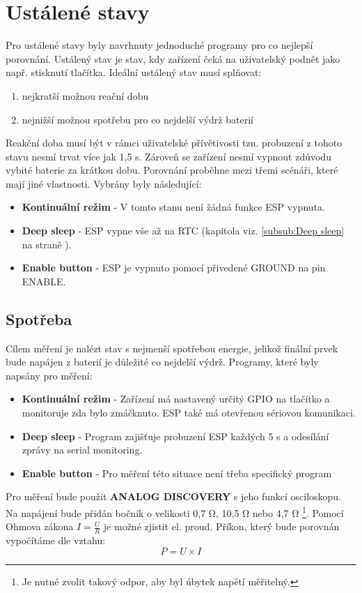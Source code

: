 \documentclass[a4paper, 12pt]{report}
\begin{document}
			\section{Ustálené stavy}
				Pro ustálené stavy byly navrhnuty jednoduché programy pro co nejlepší porovnání. Ustálený stav je stav, kdy zařízení čeká na uživatelský podnět jako např. stisknutí tlačítka. Ideální ustálený stav musí splňovat:
				\begin{enumerate}
					\item nejkratší možnou reační dobu
					\item nejnižší možnou spotřebu pro co nejdelší výdrž baterií
				\end{enumerate}
				Reakční doba musí být v rámci uživatelské přívětivosti tzn. probuzení z tohoto stavu nesmí trvat více jak 1,5 \si{s}. Zároveň se zařízení nesmí vypnout zdůvodu vybité baterie za krátkou dobu. Porovnání proběhne mezi třemi scénáři, které mají jiné vlastnosti. Vybrány byly následující:
				\begin{itemize}
					\item {\bf Kontinuální režim} - V tomto stanu není žádná funkce ESP vypnuta.
					\item {\bf Deep sleep} - ESP vypne vše až na RTC (kapitola viz. \ref{subsub:Deep sleep} na straně \pageref{subsub:Deep sleep}).
					\item {\bf Enable button} - ESP je vypnuto pomocí přivedené GROUND na pin ENABLE.
				\end{itemize}


				\subsection{Spotřeba} \label{metodika:Ustálené stavy spotřeba}
					Cílem měření je nalézt stav s nejmenší spotřebou energie, jelikož finální prvek bude napájen z baterií je důležité co nejdelší výdrž. Programy, které byly napsány pro měření:\\
					\begin{itemize}
						\item {\bf Kontinuální režim} - Zařízení má nastavený určitý GPIO na tlačítko a monitoruje zda bylo zmáčknuto. ESP také má otevřenou sériovou komunikaci.
						\item {\bf Deep sleep} - Program zajišťuje probuzení ESP každých 5 \si{s} a odesílání zprávy na serial monitoring.
						\item {\bf Enable button} - Pro měření této situace není třeba specifický program
					\end{itemize}
					Pro měření bude použit {\bf ANALOG DISCOVERY} s jeho funkcí osciloskopu. Na napájení bude přidán bočník o velikosti 0,7 \si{\ohm}, 10,5 \si{\ohm} nebo 4,7 \si{\ohm} \footnote{Je nutné zvolit takový odpor, aby byl úbytek napětí měřitelný.}. Pomocí Ohmova zákona $ I = \frac{U}{R} $ je možné zjistit el. proud.
					Příkon, který bude porovnán vypočítáme dle vztahu:
					$$P = U \times I$$
\end{document}
